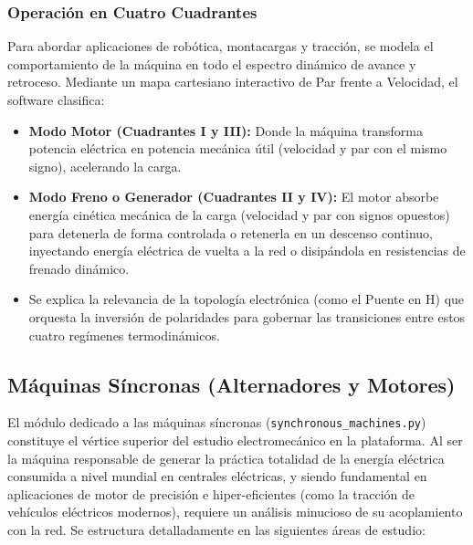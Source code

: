 \documentclass[11pt,a4paper]{article}
\begin{document}
\subsubsection{Operación en Cuatro Cuadrantes}
Para abordar aplicaciones de robótica, montacargas y tracción, se modela el comportamiento de la máquina en todo el espectro dinámico de avance y retroceso. Mediante un mapa cartesiano interactivo de Par frente a Velocidad, el software clasifica:
\begin{itemize}
    \item \textbf{Modo Motor (Cuadrantes I y III):} Donde la máquina transforma potencia eléctrica en potencia mecánica útil (velocidad y par con el mismo signo), acelerando la carga.
    \item \textbf{Modo Freno o Generador (Cuadrantes II y IV):} El motor absorbe energía cinética mecánica de la carga (velocidad y par con signos opuestos) para detenerla de forma controlada o retenerla en un descenso continuo, inyectando energía eléctrica de vuelta a la red o disipándola en resistencias de frenado dinámico.
    \item Se explica la relevancia de la topología electrónica (como el Puente en H) que orquesta la inversión de polaridades para gobernar las transiciones entre estos cuatro regímenes termodinámicos.
\end{itemize}

\subsection{Máquinas Síncronas (Alternadores y Motores)}
El módulo dedicado a las máquinas síncronas (\texttt{synchronous\_machines.py}) constituye el vértice superior del estudio electromecánico en la plataforma. Al ser la máquina responsable de generar la práctica totalidad de la energía eléctrica consumida a nivel mundial en centrales eléctricas, y siendo fundamental en aplicaciones de motor de precisión e hiper-eficientes (como la tracción de vehículos eléctricos modernos), requiere un análisis minucioso de su acoplamiento con la red. Se estructura detalladamente en las siguientes áreas de estudio:
\end{document}
